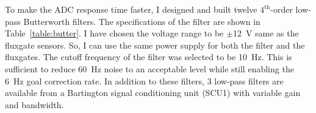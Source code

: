 To make the ADC response time faster, I designed and built twelve $\mathrm{4^{th}}$-order low-pass Butterworth filters. The specifications of the filter are shown in Table~\ref{table:butter}. I have chosen the voltage range to be $\pm$12~V same as the fluxgate sensors. So, I can use the same power supply for both the filter and the fluxgates. The cutoff frequency of the filter was selected to be 10~Hz. This is sufficient to reduce 60~Hz noise to an acceptable level while still enabling the 6~Hz goal correction rate. In addition to these filters, 3 low-pass filters are available from a Bartington signal conditioning unit (SCU1) with variable gain and bandwidth.


